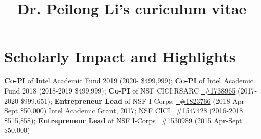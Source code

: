 \documentclass[11pt]{moderncv}
\title{Dr. Peilong Li's curiculum vitae}
\begin{document}
\maketitle

\section{Scholarly Impact and Highlights}
%
{\small 
\textbf{Co-PI} of Intel Academic Fund 2019
(2020- \$499,999);\newline
\textbf{Co-PI} of Intel Academic Fund 2018
   (2018-2019 \$499,999);\newline
\textbf{Co-PI} of NSF CICI:RSARC \href{https://nsf.gov/awardsearch/showAward?AWD_ID=1738965}
  {\color{color1}\homepagesymbol~\#1738965} (2017-2020 \$999,651);\newline
\textbf{Entrepreneur Lead} of NSF I-Corps: \href{https://nsf.gov/awardsearch/showAward?AWD_ID=1823766}
  {\color{color1}\homepagesymbol~\#1823766} (2018 Apr-Sept \$50,000)
}
%
%
{\small 
  Intel Academic Grant, 2017; \newline
  NSF CICI \href{https://www.nsf.gov/awardsearch/showAward?AWD_ID=1547428}
  {\color{color1}\homepagesymbol~\#1547428} (2016-2018 \$515,858); \newline 
  \textbf{Entrepreneur Lead} of NSF I-Corps \href{https://www.nsf.gov/awardsearch/showAward?AWD_ID=1530989}
    {\color{color1}\homepagesymbol~\#1530989} (2015 Apr-Sept \$50,000)
}
%
%
\end{document}
